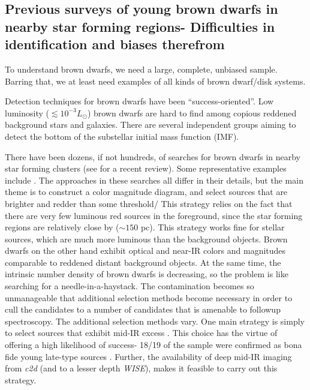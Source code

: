 \documentclass[12pt,preprint]{aastex}
\begin{document}
\subsection{Previous surveys of young brown dwarfs in nearby star forming regions- Difficulties in identification and biases therefrom}

To understand brown dwarfs, we need a large, complete, unbiased sample.  Barring that, we at least need examples of all kinds of brown dwarf/disk systems.

Detection techniques for brown dwarfs have been ``success-oriented''.  Low luminosity ($\lesssim10^{-3}L_{\odot}$) brown dwarfs are hard to find among copious reddened background stars and galaxies.  There are several independent groups aiming to detect the bottom of the substellar initial mass function (IMF).

There have been dozens, if not hundreds, of searches for brown dwarfs in nearby star forming clusters (see \citet{2012ARA&A..50...65L} for a recent review).  Some representative examples include \cite{2004ApJ...602..816L, 2012A&A...539A.151A, 2014ApJ...785..159M}.  The approaches in these searches all differ in their details, but the main theme is to construct a color magnitude diagram, and select sources that are brighter and redder than some threshold/  This strategy relies on the fact that there are very few luminous red sources in the foreground, since the star forming regions are relatively close by ($\sim150$ pc).  This strategy works fine for stellar sources, which are much more luminous than the background objects.  Brown dwarfs on the other hand exhibit optical and near-IR colors and magnitudes comparable to reddened distant background objects.  At the same time, the intrinsic number density of brown dwarfs is decreasing, so the problem is like searching for a needle-in-a-haystack.  The contamination becomes so unmanageable that additional selection methods become necessary in order to cull the candidates to a number of candidates that is amenable to followup spectroscopy.  The additional selection methods vary.  One main strategy is simply to select sources that exhibit mid-IR excess \citep{allers06}.  This choice has the virtue of offering a high likelihood of success- 18/19 of the \citet{allers06} sample were confirmed as bona fide young late-type sources \citep{2011ASPC..448..633G}.  Further, the availability of deep mid-IR imaging from \emph{c2d} (and to a lesser depth \emph{WISE}), makes it feasible to carry out this strategy.  
\end{document}

